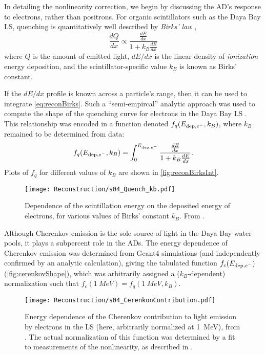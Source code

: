 \documentclass[../thesis.tex]{subfiles}
\begin{document}
In detailing the nonlinearity correction, we begin by discussing the AD's response to electrons, rather than positrons. For organic scintillators such as the Daya Bay LS, quenching is quantitatively well described by \emph{Birks' law} \cite{Birks_1951},
\begin{equation}
  \frac{dQ}{dx} \propto \frac{\frac{dE}{dx}}{1 + k_B \frac{dE}{dx}}
  \label{eq:reconBirks}
\end{equation}
where $Q$ is the amount of emitted light, $dE/dx$ is the linear density of \emph{ionization} energy deposition, and the scintillator-specific value $k_B$ is known as Birks' constant.

If the $dE/dx$ profile is known across a particle's range, then it can be used to integrate \autoref{eq:reconBirks}. Such a ``semi-empircal'' analytic approach was used to compute the shape of the quenching curve for electrons in the Daya Bay LS \cite{NonlinearityPaper}. This relationship was encoded in a function denoted $f_q(E_{\mathrm{dep},e^-}, k_B)$, where $k_B$ remained to be determined from data:
\begin{equation}
  f_q(E_{\mathrm{dep},e^-},k_B) = \int_0^{E_{\mathrm{dep},e^-}} \frac{\frac{dE}{dx}}{1 + k_B \frac{dE}{dx}}.
  \label{eq:reconBirksInt}
\end{equation}
Plots of $f_q$ for different values of $k_B$ are shown in \autoref{fig:reconBirksInt}.

\begin{figure}[h]
  \texttt{[image: Reconstruction/s04\_Quench\_kb.pdf]}
  \caption{Dependence of the scintillation energy on the deposited energy of electrons, for various values of Birks' constant $k_B$. From \cite{NonlinearityPaper}.}
  \label{fig:reconBirksInt}
\end{figure}

Although Cherenkov emission is the sole source of light in the Daya Bay water pools, it plays a subpercent role in the ADs. The energy dependence of Cherenkov emission was determined from Geant4 simulations (and independently confirmed by an analytic calculation), giving the tabulated function $f_c(E_{\mathrm{dep},e^-})$ (\autoref{fig:cerenkovShape}), which was arbitrarily assigned a ($k_B$-dependent) normalization such that $f_c(\SI{1}{MeV}) = f_q(\SI{1}{MeV}, k_B)$. 

\begin{figure}[h]
  \texttt{[image: Reconstruction/s04\_CerenkonContribution.pdf]}
  \caption{Energy dependence of the Cherenkov contribution to light emission by electrons in the LS (here, arbitrarily normalized at 1~MeV), from \cite{NonlinearityPaper}. The actual normalization of this function was determined by a fit to measurements of the nonlinearity, as described in \cite{NonlinearityPaper}.}
  \label{fig:cerenkovShape}
\end{figure}
\end{document}
